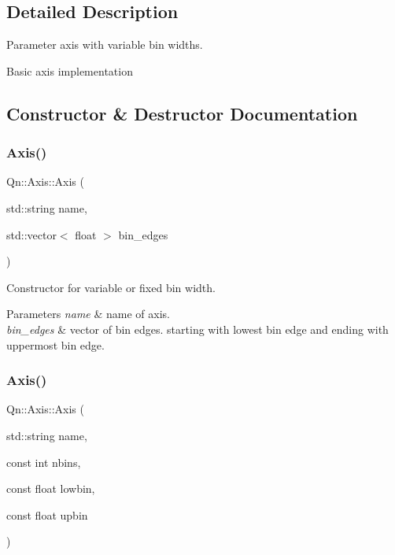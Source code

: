 \subsection{Detailed Description}
Parameter axis with variable bin widths. 

Basic axis implementation 

\subsection{Constructor \& Destructor Documentation}
\mbox{\label{classQn_1_1Axis_aecffcf8ea49a172d67e5a620082f3914}} 
\subsubsection{\texorpdfstring{Axis()}{Axis()}\hspace{0.1cm}{\footnotesize\ttfamily [1/2]}}
{\footnotesize\ttfamily Qn\+::\+Axis\+::\+Axis (\begin{DoxyParamCaption}\item[{std\+::string}]{name,  }\item[{std\+::vector$<$ float $>$}]{bin\+\_\+edges }\end{DoxyParamCaption})\hspace{0.3cm}{\ttfamily [inline]}}

Constructor for variable or fixed bin width. 
\begin{DoxyParams}{Parameters}
{\em name} & name of axis. \\
\hline
{\em bin\+\_\+edges} & vector of bin edges. starting with lowest bin edge and ending with uppermost bin edge. \\
\hline
\end{DoxyParams}
\mbox{\label{classQn_1_1Axis_aba5f6d07ac72fc4eda097edd15336c86}} 
\subsubsection{\texorpdfstring{Axis()}{Axis()}\hspace{0.1cm}{\footnotesize\ttfamily [2/2]}}
{\footnotesize\ttfamily Qn\+::\+Axis\+::\+Axis (\begin{DoxyParamCaption}\item[{std\+::string}]{name,  }\item[{const int}]{nbins,  }\item[{const float}]{lowbin,  }\item[{const float}]{upbin }\end{DoxyParamCaption})\hspace{0.3cm}{\ttfamily [inline]}}

